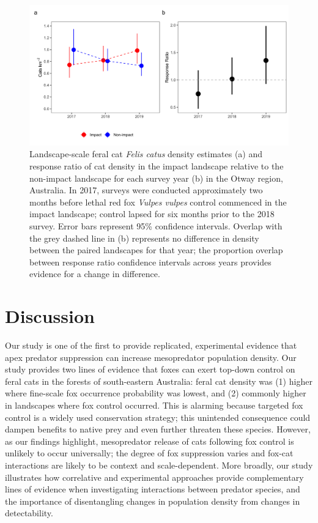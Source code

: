\documentclass[11pt,a4paper,titlepage,twoside,openright]{style/unimelbthesis}
\begin{document}
\begin{mainmatter}
\begin{figure}
{\centering \includegraphics[width=1\linewidth]{figure/otways_estimates_600dpi} 

}

\caption{Landscape-scale feral cat \textit{Felis catus} density estimates (a) and response ratio of cat density in the impact landscape relative to the non-impact landscape for each survey year (b) in the Otway region, Australia. In 2017, surveys were conducted approximately two months before lethal red fox \textit{Vulpes vulpes} control commenced in the impact landscape; control lapsed for six months prior to the 2018 survey. Error bars represent 95\% confidence intervals. Overlap with the grey dashed line in (b) represents no difference in density between the paired landscapes for that year; the proportion overlap between response ratio confidence intervals across years provides evidence for a change in difference.}\label{fig:diffo}
\end{figure}
\newpage

\hypertarget{discussion-2}{%
\section{Discussion}\label{discussion-2}}

Our study is one of the first to provide replicated, experimental evidence that apex predator suppression can increase mesopredator population density. Our study provides two lines of evidence that foxes can exert top-down control on feral cats in the forests of south-eastern Australia: feral cat density was (1) higher where fine-scale fox occurrence probability was lowest, and (2) commonly higher in landscapes where fox control occurred. This is alarming because targeted fox control is a widely used conservation strategy; this unintended consequence could dampen benefits to native prey and even further threaten these species. However, as our findings highlight, mesopredator release of cats following fox control is unlikely to occur universally; the degree of fox suppression varies and fox-cat interactions are likely to be context and scale-dependent. More broadly, our study illustrates how correlative and experimental approaches provide complementary lines of evidence when investigating interactions between predator species, and the importance of disentangling changes in population density from changes in detectability.


\end{mainmatter}
\end{document}
